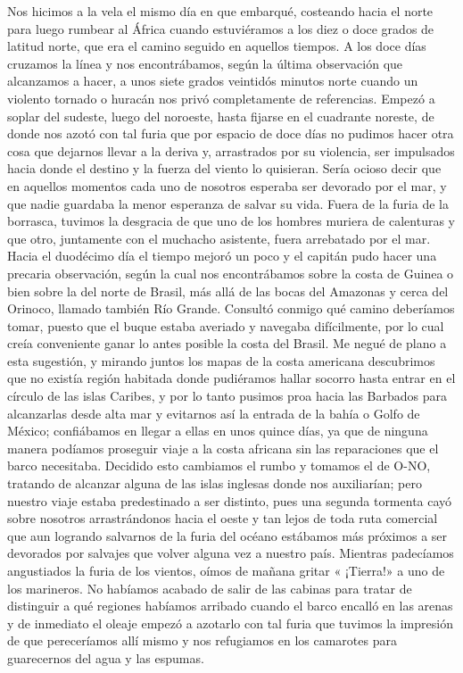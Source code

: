 \documentclass{novela}
\begin{document}
    Nos hicimos a la vela el mismo día en que embarqué, costeando hacia el norte para luego rumbear al África cuando estuviéramos a los diez o doce grados de latitud norte, que era el camino seguido en aquellos tiempos. A los doce días cruzamos la línea y nos encontrábamos, según la última observación que alcanzamos a hacer, a unos siete grados veintidós minutos norte cuando un violento tornado o huracán nos privó completamente de referencias. Empezó a soplar del sudeste, luego del noroeste, hasta fijarse en el cuadrante noreste, de donde nos azotó con tal furia que por espacio de doce días no pudimos hacer otra cosa que dejarnos llevar a la deriva y, arrastrados por su violencia, ser impulsados hacia donde el destino y la fuerza del viento lo quisieran. Sería ocioso decir que en aquellos momentos cada uno de nosotros esperaba ser devorado por el mar, y que nadie guardaba la menor esperanza de salvar su vida.
    Fuera de la furia de la borrasca, tuvimos la desgracia de que uno de los hombres muriera de calenturas y que otro, juntamente con el muchacho asistente, fuera arrebatado por el mar. Hacia el duodécimo día el tiempo mejoró un poco y el capitán pudo hacer una precaria observación, según la cual nos encontrábamos sobre la costa de Guinea o bien sobre la del norte de Brasil, más allá de las bocas del Amazonas y cerca del Orinoco, llamado también Río Grande. Consultó conmigo qué camino deberíamos tomar, puesto que el buque estaba averiado y navegaba difícilmente, por lo cual creía conveniente ganar lo antes posible la costa del Brasil.
    Me negué de plano a esta sugestión, y mirando juntos los mapas de la costa americana descubrimos que no existía región habitada donde pudiéramos hallar socorro hasta entrar en el círculo de las islas Caribes, y por lo tanto pusimos proa hacia las Barbados para alcanzarlas desde alta mar y evitarnos así la entrada de la bahía o Golfo de México; confiábamos en llegar a ellas en unos quince días, ya que de ninguna manera podíamos proseguir viaje a la costa africana sin las reparaciones que el barco necesitaba.
    Decidido esto cambiamos el rumbo y tomamos el de O-NO, tratando de alcanzar alguna de las islas inglesas donde nos auxiliarían; pero nuestro viaje estaba predestinado a ser distinto, pues una segunda tormenta cayó sobre nosotros arrastrándonos hacia el oeste y tan lejos de toda ruta comercial que aun logrando salvarnos de la furia del océano estábamos más próximos a ser devorados por salvajes que volver alguna vez a nuestro país.
    Mientras padecíamos angustiados la furia de los vientos, oímos de mañana gritar « ¡Tierra!» a uno de los marineros. No habíamos acabado de salir de las cabinas para tratar de distinguir a qué regiones habíamos arribado cuando el barco encalló en las arenas y de inmediato el oleaje empezó a azotarlo con tal furia que tuvimos la impresión de que pereceríamos allí mismo y nos refugiamos en los camarotes para guarecernos del agua y las espumas.
\end{document}
